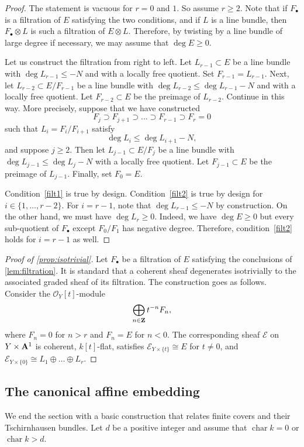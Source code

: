 \documentclass[11 pt]{amsart}
\renewcommand{\k}{k}
\renewcommand{\O}{{\mathcal O}}
\newcommand{\charac}{\operatorname{char}}
\providecommand {\Z}{{\bf Z}}
\providecommand {\A}{{\bf A}}
\numberwithin{equation}{section}
\begin{document}
\begin{proof}
  The statement is vacuous for $r = 0$ and $1$.
  So assume $r \geq 2$.
  Note that if $F_{\bullet}$ is a filtration of $E$ satisfying the two conditions, and if $L$ is a line bundle, then $F_\bullet \otimes L$ is such a filtration of $E \otimes L$.
  Therefore, by twisting by a line bundle of large degree if necessary, we may assume that $\deg E \geq 0$.

  Let us construct the filtration from right to left.
  Let $L_{r-1} \subset E$ be a line bundle with $\deg L_{r-1} \leq -N$ and with a locally free quotient.
  Set $F_{r-1} = L_{r-1}$.
  Next, let $L_{r-2} \subset E / F_{r-1}$ be a line bundle with $\deg L_{r-2} \leq \deg L_{r-1} - N$ and with a locally free quotient.
  Let $F_{r-2} \subset E$ be the preimage of $L_{r-2}$.
  Continue in this way.
  More precisely, suppose that we have constructed
  \[ F_j \supset F_{j+1} \supset \dots \supset F_{r-1} \supset F_r = 0\]
  such that $L_i = F_i / F_{i+1}$ satisfy
  \[ \deg L_{i} \leq \deg L_{i+1} - N,\]
  and suppose $j \geq 2$.
  Then let $L_{j-1} \subset E/F_j$ be a line bundle with $\deg L_{j-1} \leq \deg L_j - N$ with a locally free quotient.
  Let $F_{j-1} \subset E$ be the preimage of $L_{j-1}$.
  Finally, set $F_0 = E$.

  Condition~\ref{filt1} is true by design.
  Condition~\ref{filt2} is true by design for $i \in \{1, \dots, r-2\}$.
  For $i = r-1$, note that $\deg L_{r-1} \leq -N$ by construction.
  On the other hand, we must have $\deg L_r \geq 0$.
  Indeed, we have $\deg E \geq 0$ but every sub-quotient of $F_\bullet$ except $F_0 / F_1$ has negative degree.
  Therefore, condition~\ref{filt2} holds for $i = r-1$ as well.  
\end{proof}
\begin{proof}[Proof of \autoref{prop:isotrivial}]
  Let $F_\bullet$ be a filtration of $E$ satisfying the conclusions of \autoref{lem:filtration}.
  It is standard that a coherent sheaf degenerates isotrivially to the associated graded sheaf of its filtration.
  The construction goes as follows.
  Consider the $\O_Y[t]$-module
  \[ \bigoplus_{n \in \Z} t^{-n} F_n,\]
  where $F_n = 0$ for $n > r$ and $F_n = E$ for $n < 0$.
  The corresponding sheaf $\mathcal E$ on $Y \times \A^1$ is coherent, $\k[t]$-flat, satisfies $\mathcal E_{Y \times \{t\}} \cong E$ for $t \neq 0$, and $\mathcal E_{Y \times \{0\}} \cong L_1 \oplus \dots \oplus L_r$.
\end{proof}

\subsection{The canonical affine embedding}
We end the section with a basic construction that relates finite covers and their Tschirnhausen bundles.
Let $d$ be a positive integer and assume that $\charac \k = 0$ or $\charac \k > d$.
\end{document}
